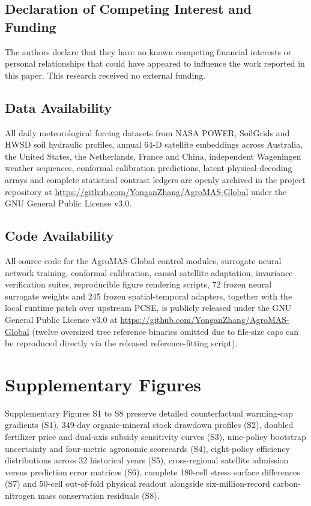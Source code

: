 \documentclass[11pt,a4paper]{article}
\begin{document}
\subsection{Declaration of Competing Interest and Funding}

The authors declare that they have no known competing financial interests or personal relationships that could have appeared to influence the work reported in this paper. This research received no external funding.

\subsection{Data Availability}

All daily meteorological forcing datasets from NASA POWER, SoilGrids and HWSD soil hydraulic profiles, annual 64-D satellite embeddings across Australia, the United States, the Netherlands, France and China, independent Wageningen weather sequences, conformal calibration predictions, latent physical-decoding arrays and complete statistical contrast ledgers are openly archived in the project repository at \url{https://github.com/YonganZhang/AgroMAS-Global} under the GNU General Public License v3.0.

\subsection{Code Availability}

All source code for the AgroMAS-Global control modules, surrogate neural network training, conformal calibration, causal satellite adaptation, invariance verification suites, reproducible figure rendering scripts, 72 frozen neural surrogate weights and 245 frozen spatial-temporal adapters, together with the local runtime patch over upstream PCSE, is publicly released under the GNU General Public License v3.0 at \url{https://github.com/YonganZhang/AgroMAS-Global} (twelve oversized tree reference binaries omitted due to file-size caps can be reproduced directly via the released reference-fitting script).

\FloatBarrier\clearpage\appendix

\FloatBarrier

\section{Supplementary Figures}

Supplementary Figures S1 to S8 preserve detailed counterfactual warming-cap gradients (S1), 349-day organic-mineral stock drawdown profiles (S2), doubled fertilizer price and dual-axis subsidy sensitivity curves (S3), nine-policy bootstrap uncertainty and four-metric agronomic scorecards (S4), eight-policy efficiency distributions across 32 historical years (S5), cross-regional satellite admission versus prediction error matrices (S6), complete 180-cell stress surface differences (S7) and 50-cell out-of-fold physical readout alongside six-million-record carbon-nitrogen mass conservation residuals (S8).
\end{document}
